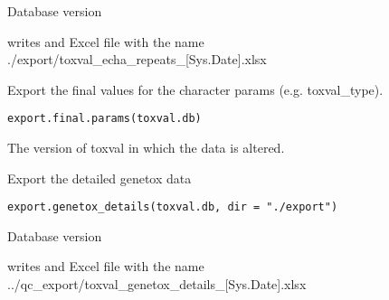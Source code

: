 \documentclass[letterpaper]{book}
\begin{document}
%
\begin{Arguments}
\begin{ldescription}
\item[\code{toxval.db}] Database version
\end{ldescription}
\end{Arguments}
%
\begin{Value}
writes and Excel file with the name
./export/toxval\_echa\_repeats\_[Sys.Date].xlsx
\end{Value}
%
\begin{Description}\relax
Export the final values for the character params (e.g. toxval\_type).
\end{Description}
%
\begin{Usage}
\begin{verbatim}
export.final.params(toxval.db)
\end{verbatim}
\end{Usage}
%
\begin{Arguments}
\begin{ldescription}
\item[\code{toxval.db}] The version of toxval in which the data is altered.
\end{ldescription}
\end{Arguments}
%
\begin{Description}\relax
Export the detailed genetox data
\end{Description}
%
\begin{Usage}
\begin{verbatim}
export.genetox_details(toxval.db, dir = "./export")
\end{verbatim}
\end{Usage}
%
\begin{Arguments}
\begin{ldescription}
\item[\code{toxval.db}] Database version
\end{ldescription}
\end{Arguments}
%
\begin{Value}
writes and Excel file with the name
../qc\_export/toxval\_genetox\_details\_[Sys.Date].xlsx
\end{Value}
\end{document}
